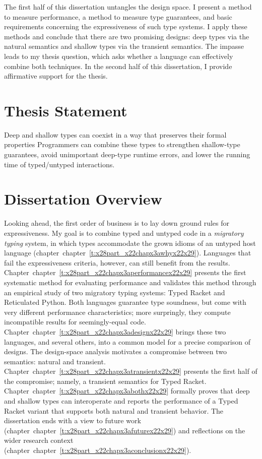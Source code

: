 \documentclass[ twoside,open=right,titlepage,numbers=noenddot,headinclude,%
                footinclude=true,cleardoublepage=empty,abstract=off,
                BCOR=5mm,paper=a4,fontsize=11pt,%
                ngerman,american,%
                parts,pdfspacing]{scrreprt}
\newcommand{\ChapRef}[2]{\SecRef{#1}{#2}}
\newcommand{\SecRef}[2]{section~#1}
\newcommand{\ChapRefLocal}[3]{\hyperref[#1]{\ChapRef{#2}{#3}}}
\let\SOriginalthesubsubsection\thesubsubsection
\newcommand{\Ssubsection}[2]{\subsection[#1]{#2}\let\thesubsubsection\SOriginalthesubsubsection}
\renewcommand{\Ssubsection}[2]{\section[#1]{#2}}
\renewcommand{\ChapRefLocal}[3]{chapter~\ref{#1}}
\begin{document}
The first half of this dissertation untangles the design space.
I present a method to measure performance, a method to measure type guarantees,
 and basic requirements concerning the expressiveness of such type systems.
I apply these methods and conclude that there are two promising designs:
 deep types via the natural semantics and shallow types via
 the transient semantics.
The impasse leads to my thesis question, which asks whether a language can
 effectively combine both techniques.
In the second half of this dissertation, I provide affirmative support for
 the thesis.

\Ssubsection{Thesis Statement}{Thesis Statement}\label{t:x28part_x22Thesisx5fStatementx22x29}

Deep and shallow types can coexist in a way that preserves their formal
properties
Programmers can combine these types to strengthen shallow{-}type
guarantees, avoid unimportant deep{-}type runtime errors, and lower the
running time of typed/untyped interactions.

\Ssubsection{Dissertation Overview}{Dissertation Overview}\label{t:x28part_x22Dissertationx5fOverviewx22x29}

Looking ahead, the first order of business is to lay down ground rules for
 expressiveness.
My goal is to combine typed and untyped code in a \emph{migratory typing}
 system, in which types accommodate the grown idioms of an
 untyped host language (chapter~\ChapRefLocal{t:x28part_x22chapx3awhyx22x29}{2}{Migratory Typing}).
Languages that fail the expressiveness criteria, however, can still benefit
 from the results.
Chapter~\ChapRefLocal{t:x28part_x22chapx3aperformancex22x29}{3}{Performance Analysis Method} presents the first systematic method for evaluating performance
 and validates this method through an empirical study of two migratory
 typing systems: Typed Racket and Reticulated Python.
Both languages guarantee type soundness, but come with very different
 performance characteristics; more surpringly, they compute incompatible results for
 seemingly{-}equal code.
Chapter~\ChapRefLocal{t:x28part_x22chapx3adesignx22x29}{4}{Design Analysis Method} brings these two languages, and several others,
 into a common model for a precise comparison of designs.
The design{-}space analysis motivates a compromise between two semantics:
 natural and transient.
Chapter~\ChapRefLocal{t:x28part_x22chapx3atransientx22x29}{5}{Shallow Racket} presents the first half of the compromise;
 namely, a transient semantics for Typed Racket.
Chapter~\ChapRefLocal{t:x28part_x22chapx3abothx22x29}{6}{Deep and Shallow, Combined} formally proves that deep and shallow
 types can interoperate and reports the performance of a Typed Racket variant
 that supports both natural and transient behavior.
The dissertation ends with a view to future work (chapter~\ChapRefLocal{t:x28part_x22chapx3afuturex22x29}{7}{Future Work})
 and reflections on the wider research context (chapter~\ChapRefLocal{t:x28part_x22chapx3aconclusionx22x29}{8}{Conclusion}).
\end{document}
